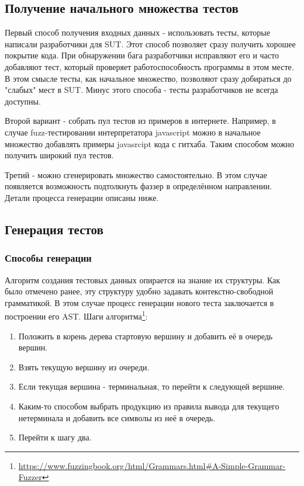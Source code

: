\documentclass[a4paper]{article}
\begin{document}
\subsection{Получение начального множества тестов}
\indent

Первый способ получения входных данных - использовать тесты, которые написали разработчики для SUT. Этот способ позволяет сразу получить хорошее покрытие кода. При обнаружении бага разработчики исправляют его и часто добавляют тест, который проверяет работоспособность программы в этом месте. В этом смысле тесты, как начальное множество, позволяют сразу добираться до "слабых" мест в SUT. Минус этого способа - тесты разработчиков не всегда доступны.
\indent

Второй вариант - собрать пул тестов из примеров в интернете. Например, в случае fuzz-тестировании интерпретатора javascript можно в начальное множество добавлять примеры javasrcipt кода с гитхаба. Таким способом можно получить широкий пул тестов.
\indent

Третий - можно сгенерировать множество самостоятельно. В этом случае появляется возможность подтолкнуть фаззер в определённом направлении. Детали процесса генерации описаны ниже.

\subsection{Генерация тестов}
\indent

\subsubsection{Способы генерации}
\indent

Алгоритм создания тестовых данных опирается на знание их структуры. Как было отмечено ранее, эту структуру удобно задавать контекстно-свободной грамматикой. В этом случае процесс генерации нового теста заключается в построении его AST. Шаги алгоритма\footnote[1]{\href{https://www.fuzzingbook.org/html/Grammars.html\#A-Simple-Grammar-Fuzzer}{https://www.fuzzingbook.org/html/Grammars.html\#A-Simple-Grammar-Fuzzer}}:

\begin{enumerate}
    \item Положить в корень дерева стартовую вершину и добавить её в очередь вершин.
    \item Взять текущую вершину из очереди.
    \item Если текущая вершина - терминальная, то перейти к следующей вершине.
    \item Каким-то способом выбрать продукцию из правила вывода для текущего нетерминала и добавить все символы из неё в очередь.
    \item Перейти к шагу два.
\end{enumerate}
\end{document}
